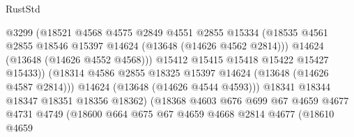 \begin{lexlean}{RustStd}
\begin{coremodule}
                                        @3299
                                        (@18521
                                          @4568
                                          @4575
                                          @2849
                                          @4551
                                          @2855
                                          @15334
                                          (@18535
                                            @4561
                                            @2855
                                            @18546
                                            @15397
                                            @14624
                                            (@13648 (@14626 @4562 @2814)))
                                          @14624
                                          (@13648 (@14626 @4552 @4568)))
                                        @15412
                                        @15415
                                        @15418
                                        @15422
                                        @15427
                                        @15433))
                                    (@18314
                                      @4586
                                      @2855
                                      @18325
                                      @15397
                                      @14624
                                      (@13648 (@14626 @4587 @2814)))
                                    @14624
                                    (@13648 (@14626 @4544 @4593)))
                                  @18341
                                  @18344
                                  @18347
                                  @18351
                                  @18356
                                  @18362)
                                (@18368
                                  @4603
                                  @676
                                  @699
                                  @67
                                  @4659
                                  @4677
                                  @4731
                                  @4749
                                  (@18600
                                    @664
                                    @675
                                    @67
                                    @4659
                                    @4668
                                    @2814
                                    @4677
                                    (@18610
                                      @4659

\end{coremodule}
\end{lexlean}
